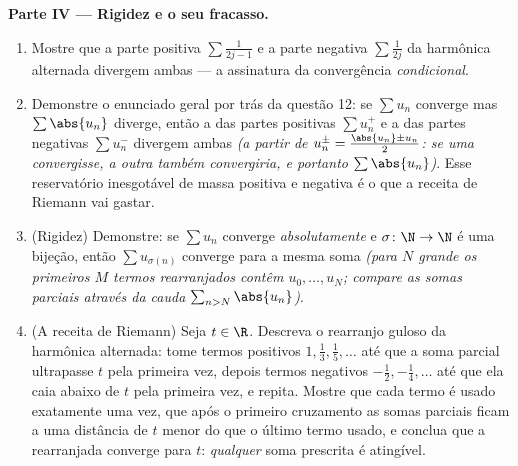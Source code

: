 \begin{problem}[{Problema de fim de semana --- $H_n = \ln n + \gamma +
\frac{1}{2n} + O(n^{-2})$, e rearranjar $1 - \frac12 +
\frac13 - \dots$ para $\frac{\ln 2}{2}$}]
\medskip
\noindent\textbf{Parte IV --- Rigidez e o seu fracasso.}
\begin{enumerate}[resume]
  \item Mostre que a parte positiva $\sum \frac{1}{2j-1}$ e a parte negativa $\sum \frac{1}{2j}$ da
         harmônica alternada divergem ambas --- a assinatura da
        convergência \emph{condicional}.
  \item Demonstre o enunciado geral por trás da questão 12: se
        $\sum u_n$ converge mas $\sum \abs{u_n}$ diverge, então a  das partes
        positivas $\sum u_n^+$ e a das partes negativas $\sum u_n^-$ divergem
        ambas \emph{(a partir de $u_n^\pm = \frac{\abs{u_n} \pm u_n}{2}$: se uma convergisse, a outra
        também convergiria, e portanto $\sum\abs{u_n}$)}.
        Esse reservatório inesgotável de massa positiva e negativa
        é o que a receita de Riemann vai gastar.
  \item (Rigidez) Demonstre: se $\sum u_n$ converge
        \emph{absolutamente} e $\sigma \colon \N \to \N$ é uma bijeção, então $\sum u_{\sigma(n)}$
        converge para a mesma soma \emph{(para $N$ grande os
        primeiros $M$ termos rearranjados contêm $u_0, \dots, u_N$; compare as
        somas parciais através da cauda $\sum_{n > N}\abs{u_n}$)}.
  \item (A receita de Riemann) Seja $t \in \R$. Descreva o rearranjo
        guloso da  harmônica alternada: tome termos positivos
        $1, \frac13, \frac15, \dots$ até que a soma parcial ultrapasse $t$ pela primeira
        vez, depois termos negativos $-\frac12, -\frac14, \dots$ até que ela caia abaixo
        de $t$ pela primeira vez, e repita. Mostre que cada termo é
        usado exatamente uma vez, que após o primeiro cruzamento as
        somas parciais ficam a uma distância de $t$ menor do que o
        último termo usado, e conclua que a  rearranjada
        converge para $t$: \emph{qualquer} soma prescrita é
        atingível.
\end{enumerate}


\end{problem}
